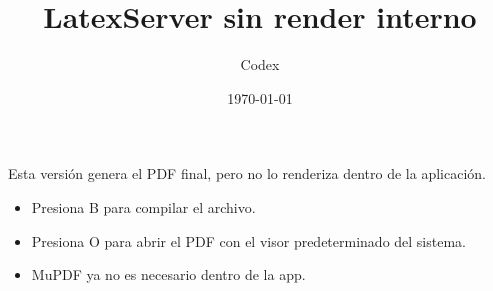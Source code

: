\documentclass{article}
\title{LatexServer sin render interno}
\author{Codex}
\date{\today}
\begin{document}
\maketitle

Esta versi\'on genera el PDF final, pero no lo renderiza dentro de la aplicaci\'on.

\begin{itemize}
    \item Presiona B para compilar el archivo.
    \item Presiona O para abrir el PDF con el visor predeterminado del sistema.
    \item MuPDF ya no es necesario dentro de la app.
\end{itemize}
\end{document}

